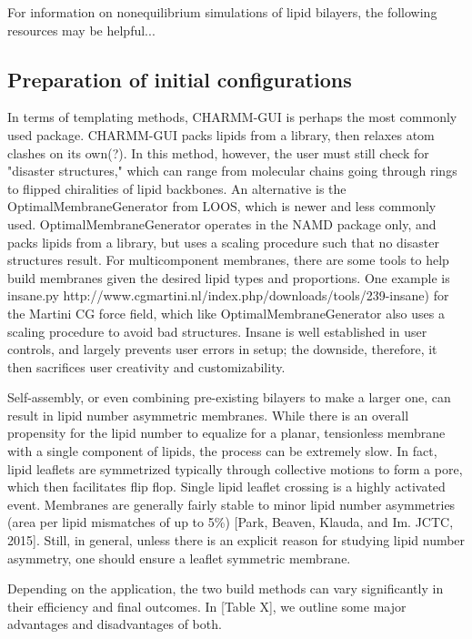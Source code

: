 \documentclass[9pt,bestpractices]{livecoms}
\begin{document}
For information on nonequilibrium simulations of lipid bilayers, the following resources may be helpful...

\subsection{Preparation of initial configurations}

In terms of templating methods, CHARMM-GUI is perhaps the most commonly used package.
CHARMM-GUI packs lipids from a library, then relaxes atom clashes on its own(?).
In this method, however, the user must still check for "disaster structures," which can range from molecular chains going through rings to flipped chiralities of lipid backbones.
An alternative is the OptimalMembraneGenerator from LOOS, which is newer and less commonly used.
OptimalMembraneGenerator operates in the NAMD package only, and packs lipids from a library, but uses a scaling procedure such that no disaster structures result.
For multicomponent membranes, there are some tools to help build membranes given the desired lipid types and proportions.
One example is insane.py http://www.cgmartini.nl/index.php/downloads/tools/239-insane) for the Martini CG force field, which like OptimalMembraneGenerator also uses a scaling procedure to avoid bad structures.
Insane is well established in user controls, and largely prevents user errors in setup; the downside, therefore, it then sacrifices user creativity and customizability.

Self-assembly, or even combining pre-existing bilayers to make a larger one, can result in lipid number asymmetric membranes.
While there is an overall propensity for the lipid number to equalize for a planar, tensionless membrane with a single component of lipids, the process can be extremely slow.
In fact, lipid leaflets are symmetrized typically through collective motions to form a pore, which then facilitates flip flop.
Single lipid leaflet crossing is a highly activated event.
Membranes are generally fairly stable to minor lipid number asymmetries (area per lipid mismatches of up to 5\%) [Park, Beaven, Klauda, and Im. JCTC, 2015].
Still, in general, unless there is an explicit reason for studying lipid number asymmetry, one should ensure a leaflet symmetric membrane.

Depending on the application, the two build methods can vary significantly in their efficiency and final outcomes.
In [Table X], we outline some major advantages and disadvantages of both.
\end{document}
